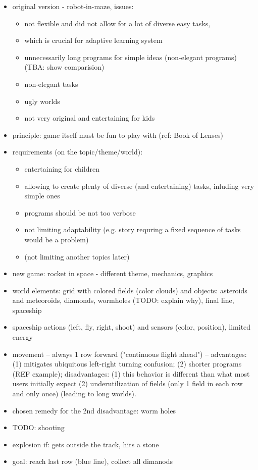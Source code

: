\begin{itemize}
\item original version - robot-in-maze, issues:
  \begin{itemize}
  \item not flexible and did not allow for a lot of diverse easy tasks,
  \item which is crucial for adaptive learning system
  \item unnecessarily long programs for simple ideas (non-elegant programs) (TBA: show comparision)
  \item non-elegant tasks
  \item ugly worlds
  \item not very original and entertaining for kids
  \end{itemize}
\item principle: game itself must be fun to play with (ref: Book of Lenses)
\item requirements (on the topic/theme/world):
  \begin{itemize}
  \item entertaining for children
  \item allowing to create plenty of diverse (and entertaining) tasks, inluding very simple ones
  \item programs should be not too verbose
  \item not limiting adaptability (e.g. story requring a fixed sequence of tasks would be a problem)
  \item (not limiting another topics later)
  \end{itemize}
\item new game: rocket in space - different theme, mechanics, graphics
\item world elements: grid with colored fields (color clouds) and objects: asteroids and meteoroids, diamonds, wormholes (TODO: explain why), final line, spaceship
\item spaceship actions (left, fly, right, shoot) and sensors (color, position), limited energy
\item movement -- always 1 row forward ("continuous flight ahead") --
  advantages:
  (1) mitigates ubiquitous left-right turning confusion;
  (2) shorter programs (REF example);
  disadvantages:
  (1) this behavior is different than what most users initially expect
  (2) underutilization of fields (only 1 field in each row and only once)
      (leading to long worlds).
\item chosen remedy for the 2nd disadvantage: worm holes
\item TODO: shooting
\item explosion if: gets outside the track, hits a stone
\item goal: reach last row (blue line), collect all dimanods

\end{itemize}

